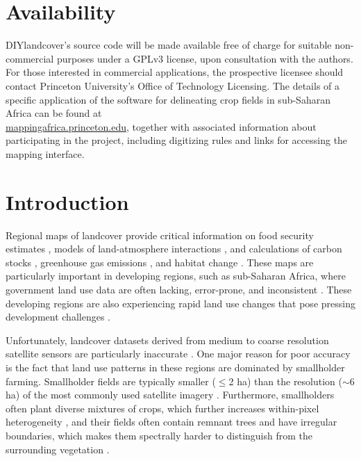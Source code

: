 \documentclass[preprint,12pt,authoryear]{elsarticle}
\begin{document}
\linenumbers

\section*{Availability}
\indent DIYlandcover's source code will be made available free of charge for suitable non-commercial purposes under a GPLv3 license, upon consultation with the authors. For those interested in commercial applications, the prospective licensee should contact Princeton University's Office of Technology Licensing. The details of a specific application of the software for delineating crop fields in sub-Saharan Africa can be found at \\
\href{http://mappingafrica.princeton.edu}{mappingafrica.princeton.edu}, together with associated information about participating in the project, including digitizing rules and links for accessing the mapping interface.

\section{Introduction}
Regional maps of landcover provide critical information on food security estimates \citep[e.g.][]{monfreda_farming_2008,licker_mind_2010,see_improved_2015,lobell_use_2013}, models of land-atmosphere interactions \citep[e.g.][]{liang_simple_1994}, and calculations of carbon stocks \citep[e.g.][]{ruesch_new_2008}, greenhouse gas emissions \citep[e.g.][]{searchinger_high_2015}, and habitat change \citep[e.g.][]{gibbs_tropical_2010}. These maps are particularly important in developing regions, such as sub-Saharan Africa, where government land use data are often lacking, error-prone, and inconsistent \citep{ramankutty_farming_2008,see_improved_2015}. These developing regions are also experiencing rapid land use changes \citep{gibbs_tropical_2010,rulli_global_2013} that pose pressing development challenges \citep[e.g. how to feed people at substantially lower environmental cost][]{searchinger_high_2015}. 

Unfortunately, landcover datasets derived from medium to coarse resolution satellite sensors are particularly inaccurate \citep{fritz_comparison_2010, fritz_identifying_2008}. One major reason for poor accuracy is the fact that land use patterns in these regions are dominated by smallholder farming. Smallholder fields are typically smaller ($\leq$2 ha) than the resolution ($\sim$6 ha) of the most commonly used satellite imagery \citep{jain_mapping_2013}. Furthermore, smallholders often plant diverse mixtures of crops, which further increases within-pixel heterogeneity \citep{jain_mapping_2013}, and their fields often contain remnant trees and have irregular boundaries, which makes them spectrally harder to distinguish from the surrounding vegetation \citep{see_improved_2015, lobell_use_2013}. 
\end{document}
